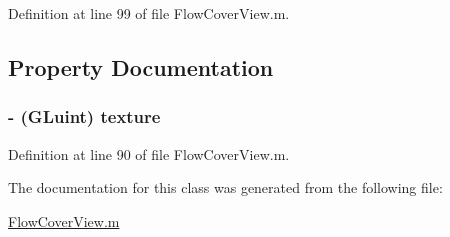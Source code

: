 Definition at line 99 of file FlowCoverView.m.



\subsection{Property Documentation}
\hypertarget{interface_flow_cover_record_a0704dfe56dec926cb35f7bdc0834ecd0}{
\subsubsection[{texture}]{\setlength{\rightskip}{0pt plus 5cm}-\/ (GLuint) texture}}
\label{interface_flow_cover_record_a0704dfe56dec926cb35f7bdc0834ecd0}


Definition at line 90 of file FlowCoverView.m.



The documentation for this class was generated from the following file:\begin{DoxyCompactItemize}
\item 
\hyperlink{_flow_cover_view_8m}{FlowCoverView.m}\end{DoxyCompactItemize}
